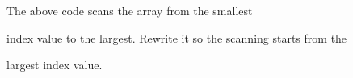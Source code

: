 The above code scans the array from the smallest

index value to the largest. Rewrite it so the scanning starts from the

largest index value.

